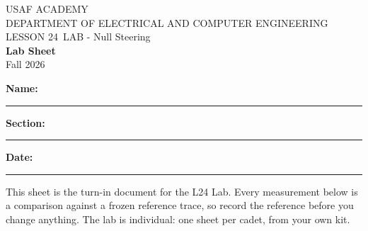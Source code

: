 \documentclass{exam}
\def\labLesson{24}
\def\thisterm{\thisTermIn}
\def\thisterm{Fall 2026}
\begin{document}
\pagestyle{headandfoot}   %



\begin{center}
USAF ACADEMY \\
DEPARTMENT OF ELECTRICAL AND COMPUTER ENGINEERING \\
LESSON \labLesson\ LAB - Null Steering \\
\textbf{Lab Sheet} \\
\thisterm \\[4mm]
\end{center}

\vspace{-4pt}
\textbf{Name:} \rule[-2pt]{2.6in}{0.4pt} \hfill
\textbf{Section:} \rule[-2pt]{0.9in}{0.4pt} \hfill
\textbf{Date:} \rule[-2pt]{1.1in}{0.4pt}

\vspace{4pt}


\vspace{2pt}

This sheet is the turn-in document for the L24 Lab. Every measurement
below is a comparison against a frozen reference trace, so record the reference
before you change anything. The lab is individual: one sheet per cadet, from your own kit.
\end{document}

